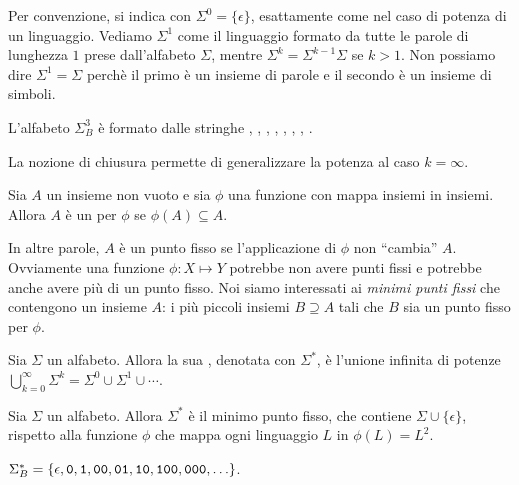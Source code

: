 Per convenzione, si indica con $\Sigma^{0} = \{ \epsilon \}$, esattamente come nel caso di potenza di un linguaggio.
Vediamo $\Sigma^{1}$ come il linguaggio formato da tutte le parole di lunghezza $1$ prese dall'alfabeto
$\Sigma$, mentre $\Sigma^{k} = \Sigma^{k-1} \Sigma$ se $k>1$.
Non possiamo dire $\Sigma^{1} = \Sigma$ perchè il primo è un insieme di parole e il secondo è un
insieme di simboli.

\begin{example}\label{exa:L3}
	L'alfabeto $\Sigma_{B}^{3}$ è formato dalle stringhe \zero\zero\zero, \zero\zero\uno, \zero\uno\zero, \zero\uno\uno, \uno\zero\zero, \uno\zero\uno, \uno\uno\zero, \uno\uno\uno.
\end{example}


La nozione di chiusura permette di generalizzare la potenza al caso $k=\infty$.




\begin{definition}\label{def:punto-fisso}
	Sia $A$ un insieme non vuoto e sia $\phi$ una funzione con mappa insiemi in insiemi.
	Allora $A$ è un  per $\phi$ se $\phi(A) \subseteq A$.
\end{definition}

In altre parole, $A$ è un punto fisso se l'applicazione di $\phi$ non ``cambia'' $A$.
Ovviamente una funzione $\phi: X\mapsto Y$ potrebbe non avere punti fissi e potrebbe anche avere più di un punto fisso.
Noi siamo interessati ai \emph{minimi punti fissi} che contengono un insieme $A$: i più piccoli insiemi $B\supseteq A$
tali che $B$ sia un punto fisso per $\phi$.

\begin{definition}\label{def:kleene}
	Sia $\Sigma$ un alfabeto.
	Allora la sua , denotata con $\Sigma^{*}$, è l'unione infinita di potenze
	$\bigcup_{k=0}^{\infty} \Sigma^k = \Sigma^0 \cup \Sigma^1 \cup \cdots$.
\end{definition}

\begin{proposition}\label{prop:kleene-punto-fisso}
	Sia $\Sigma$ un alfabeto.
	Allora $\Sigma^{*}$ è il minimo punto fisso, che contiene $\Sigma \cup \{\epsilon\}$, rispetto alla funzione
	$\phi$ che mappa ogni linguaggio $L$ in $\phi(L) = L^{2}$.
\end{proposition}

\begin{example}\label{exa:chiusura-kleene}
	$\Sigma_{B}^{*} = \{\epsilon,\mathtt{0},\mathtt{1},\mathtt{0}\mathtt{0},\mathtt{0}\mathtt{1},\mathtt{1}\mathtt{0},\mathtt{1}\mathtt{0}\mathtt{0},\mathtt{0}\mathtt{0}\mathtt{0},\ldots \}$.
\end{example}

